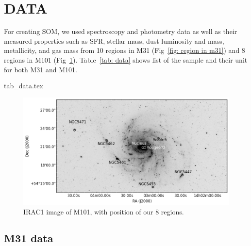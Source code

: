 
\section{DATA}

For creating SOM, we used spectroscopy and photometry data as well as their measured properties such as SFR, stellar mass, dust luminosity and mass, metallicity, and gas mass from 10 regions in M31 (Fig~\ref{fig: region in m31}) and 8 regions in M101 (Fig~\ref{fig: region in m101}).
Table~\ref{tab: data} shows list of the sample and their unit for both M31 and M101.

{tab_data.tex}
\begin{figure}
    \includegraphics[width=164mm]{../images/M101/M101.png}
    \caption{IRAC1 image of M101, with position of our 8 regions.}
    \label{fig: region in m101}
\end{figure}

    \subsection{M31 data}
      
